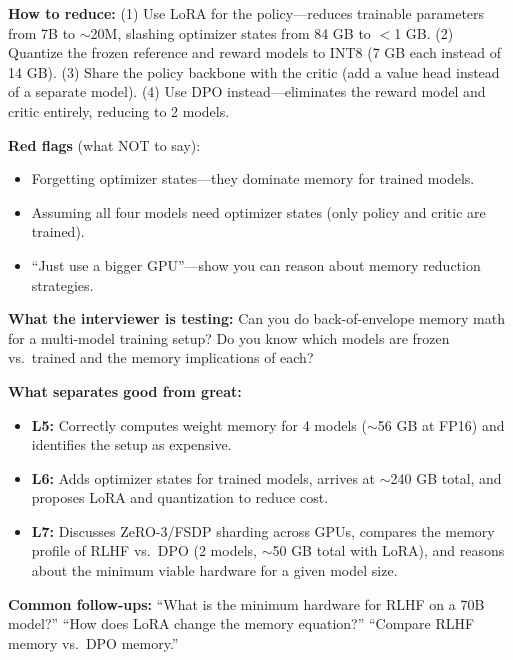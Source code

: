 \begin{interviewq}
\textbf{How to reduce:} (1) Use LoRA for the policy---reduces trainable parameters from 7B to $\sim$20M, slashing optimizer states from 84 GB to $<$1 GB. (2) Quantize the frozen reference and reward models to INT8 (7 GB each instead of 14 GB). (3) Share the policy backbone with the critic (add a value head instead of a separate model). (4) Use DPO instead---eliminates the reward model and critic entirely, reducing to 2 models.

\textbf{Red flags} (what NOT to say):
\begin{itemize}
    \item Forgetting optimizer states---they dominate memory for trained models.
    \item Assuming all four models need optimizer states (only policy and critic are trained).
    \item ``Just use a bigger GPU''---show you can reason about memory reduction strategies.
\end{itemize}

\textbf{What the interviewer is testing:} Can you do back-of-envelope memory math for a multi-model training setup? Do you know which models are frozen vs.\ trained and the memory implications of each?

\textbf{What separates good from great:}
\begin{itemize}
    \item \textbf{L5:} Correctly computes weight memory for 4 models ($\sim$56 GB at FP16) and identifies the setup as expensive.
    \item \textbf{L6:} Adds optimizer states for trained models, arrives at $\sim$240 GB total, and proposes LoRA and quantization to reduce cost.
    \item \textbf{L7:} Discusses ZeRO-3/FSDP sharding across GPUs, compares the memory profile of RLHF vs.\ DPO (2 models, $\sim$50 GB total with LoRA), and reasons about the minimum viable hardware for a given model size.
\end{itemize}

\textbf{Common follow-ups:} ``What is the minimum hardware for RLHF on a 70B model?'' ``How does LoRA change the memory equation?'' ``Compare RLHF memory vs.\ DPO memory.''
\end{interviewq}


